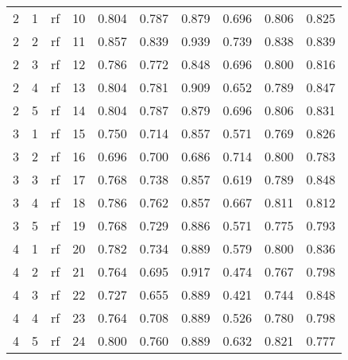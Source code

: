 \begin{tabular}{llllrrrrrr}
   2 &           1 &    rf &          10 & 0.804 &  0.787 &        0.879 &        0.696 & 0.806 & 0.825 \\
   2 &           2 &    rf &          11 & 0.857 &  0.839 &        0.939 &        0.739 & 0.838 & 0.839 \\
   2 &           3 &    rf &          12 & 0.786 &  0.772 &        0.848 &        0.696 & 0.800 & 0.816 \\
   2 &           4 &    rf &          13 & 0.804 &  0.781 &        0.909 &        0.652 & 0.789 & 0.847 \\
   2 &           5 &    rf &          14 & 0.804 &  0.787 &        0.879 &        0.696 & 0.806 & 0.831 \\
   3 &           1 &    rf &          15 & 0.750 &  0.714 &        0.857 &        0.571 & 0.769 & 0.826 \\
   3 &           2 &    rf &          16 & 0.696 &  0.700 &        0.686 &        0.714 & 0.800 & 0.783 \\
   3 &           3 &    rf &          17 & 0.768 &  0.738 &        0.857 &        0.619 & 0.789 & 0.848 \\
   3 &           4 &    rf &          18 & 0.786 &  0.762 &        0.857 &        0.667 & 0.811 & 0.812 \\
   3 &           5 &    rf &          19 & 0.768 &  0.729 &        0.886 &        0.571 & 0.775 & 0.793 \\
   4 &           1 &    rf &          20 & 0.782 &  0.734 &        0.889 &        0.579 & 0.800 & 0.836 \\
   4 &           2 &    rf &          21 & 0.764 &  0.695 &        0.917 &        0.474 & 0.767 & 0.798 \\
   4 &           3 &    rf &          22 & 0.727 &  0.655 &        0.889 &        0.421 & 0.744 & 0.848 \\
   4 &           4 &    rf &          23 & 0.764 &  0.708 &        0.889 &        0.526 & 0.780 & 0.798 \\
   4 &           5 &    rf &          24 & 0.800 &  0.760 &        0.889 &        0.632 & 0.821 & 0.777 \\
\bottomrule
\end{tabular}
